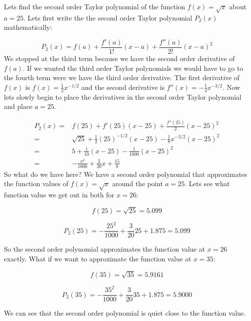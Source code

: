 \documentclass[main.tex]{subfiles}
\begin{document}
\begin{example}
Lets find the second order Taylor polynomial of the function $f(x) = \sqrt{x}$ about $a=25$. Lets first write the the second order Taylor polynomial $P_2(x)$ mathematically:

\begin{equation}
P_2(x) = f(a) + \frac{f'(a)}{1!}(x-a) + \frac{f''(a)}{2!}(x-a)^2
\end{equation}
We stopped at the third term because we have the second order derivative of $f(a)$. If we wanted the third order Taylor polynomials we would have to go to the fourth term were we have the third order derivative. The first derivative of $f(x)$ is $f(x)=\frac{1}{2}x^{-1/2}$ and the second derivative is $f''(x) = -\frac{1}{4}x^{-3/2}$. Now lets slowly begin to place the derivatives in the second order Taylor polynomial and place $a=25$.

\begin{align}
P_2(x) =& f(25) +f'(25)(x-25) + \frac{f''(25)}{2}(x-25)^2\\
=& \sqrt{25} + \frac{1}{2}(25)^{-1/2}(x-25) -\frac{1}{8}x^{-3/2}(x-25)^2 \\
=& 5 + \frac{1}{10}(x-25) - \frac{1}{1000}(x-25)^2 \\
=& -\frac{x^2}{1000} + \frac{3}{20}x + \frac{15}{8}
\end{align}  
So what do we have here? We have a second order polynomial that approximates the function values of $f(x)=\sqrt{x}$ around the point $a=25$. Lets see what function value we get out in both for $x = 26$:

\begin{equation}
f(25) = \sqrt{25} = 5.099
\end{equation}

\begin{equation}
P_2(25) = -\frac{25^2}{1000} + \frac{3}{20}25 + 1.875 = 5.099
\end{equation}

So the second order polynomial approximates the function value at $x = 26$ exactly. What if we want to approximate the function value at $x=35$:

\begin{equation}
f(35) = \sqrt{35} = 5.9161
\end{equation}

\begin{equation}
P_2(35) = -\frac{35^2}{1000} + \frac{3}{20}35 + 1.875 = 5.9000
\end{equation}

We can see that the second order polynomial is quiet close to the function value. 
 
\end{example}
\end{document}
